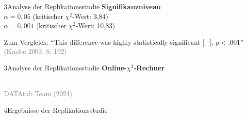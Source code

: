 \documentclass[xcolor=table,9pt,aspectratio=169]{beamer}
\begin{document}
\begin{frame}{\vspace*{10mm}3\hspace*{1em}Analyse der Replikationsstudie}
\textbf{Signifikanzniveau}\\
\smallskip
$\alpha=0,05$ (kritischer $\chi^{2}$-Wert: 3,84)\\
\smallskip
$\alpha=0,001$ (kritischer $\chi^{2}$-Wert: 10,83)

\bigskip
Zum Vergleich: \enquote{This difference was highly statistically significant [$\cdots$], $p<.001$}\\
\textcolor{gray}{(Knobe 2003, S. 192)}

\end{frame}


\begin{frame}{\vspace*{10mm}3\hspace*{1em}Analyse der Replikationsstudie}
\textbf{Online-$\chi^{2}$-Rechner}\\
\begin{center}
   \\
   \textcolor{gray}{DATAtab Team (2024)}
\end{center}
\end{frame}


\begin{frame}
\begin{overlayarea}{\textwidth}{0.81\paperheight}{
   \vspace*{11mm}
   \textcolor{uolblue}
   {4\hspace*{1em}Ergebnisse der Replikationsstudie}
}
\end{overlayarea}
\end{frame}
\end{document}
